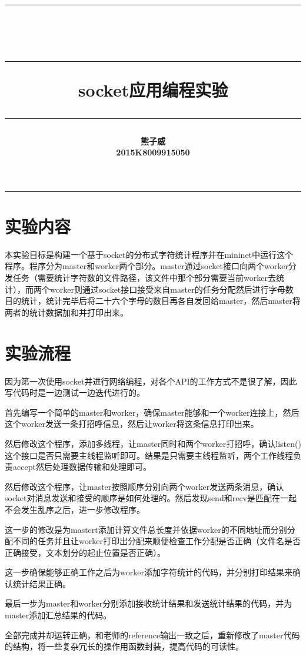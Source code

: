 \documentclass{ctexart}
\title{\center \rule{16.4cm}{1mm} \\ \rule{3.2cm}{1mm}\hfill \bfseries\Huge socket应用编程实验 \hfill \rule{3.2cm}{1mm}}
\author{\bfseries\Large 熊子威 \\ 2015K8009915050}
\date{}
\begin{document}
\maketitle
\begin{center}
\rule{16.6cm}{0.3mm}  
\end{center}

\section{实验内容}
本实验目标是构建一个基于socket的分布式字符统计程序并在mininet中运行这个程序。程序分为master和worker两个部分。master通过socket接口向两个worker分发任务（需要统计字符数的文件路径，该文件中那个部分需要当前worker去统计），而两个worker则通过socket接口接受来自master的任务分配然后进行字母数目的统计，统计完毕后将二十六个字母的数目再各自发回给master，然后master将两者的统计数据加和并打印出来。
\section{实验流程}
因为第一次使用socket并进行网络编程，对各个API的工作方式不是很了解，因此写代码时是一边测试一边迭代进行的。\par
首先编写一个简单的master和worker，确保master能够和一个worker连接上，然后这个worker发送一条打招呼信息，然后让worker将这条信息打印出来。\par
然后修改这个程序，添加多线程，让master同时和两个worker打招呼，确认listen()这个接口是否只需要主线程监听即可。结果是只需要主线程监听，两个工作线程负责accept然后处理数据传输和处理即可。\par
然后修改这个程序，让master按照顺序分别向两个worker发送两条消息，确认socket对消息发送和接受的顺序是如何处理的。然后发现send和recv是匹配在一起不会发生乱序之后，进一步修改程序。\par
这一步的修改是为mastert添加计算文件总长度并依据worker的不同地址而分别分配不同的任务并且让worker打印出分配来顺便检查工作分配是否正确（文件名是否正确接受，文本划分的起止位置是否正确）。\par
这一步确保能够正确工作之后为worker添加字符统计的代码，并分别打印结果来确认统计结果正确。\par
最后一步为master和worker分别添加接收统计结果和发送统计结果的代码，并为master添加汇总结果的代码。\par
全部完成并却运转正确，和老师的reference输出一致之后，重新修改了master代码的结构，将一些复杂冗长的操作用函数封装，提高代码的可读性。
\end{document}
